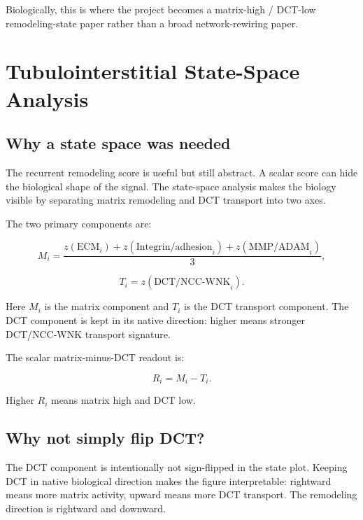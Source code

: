 \documentclass[11pt]{article}
\begin{document}
Biologically, this is where the project becomes a matrix-high / DCT-low remodeling-state paper rather than a broad network-rewiring paper.

\section{Tubulointerstitial State-Space Analysis}

\subsection{Why a state space was needed}

The recurrent remodeling score is useful but still abstract. A scalar score can hide the biological shape of the signal. The state-space analysis makes the biology visible by separating matrix remodeling and DCT transport into two axes.

The two primary components are:

\begin{equation}
M_i=\frac{z(\mathrm{ECM}_i)+z(\mathrm{Integrin/adhesion}_i)+z(\mathrm{MMP/ADAM}_i)}{3},
\end{equation}

\begin{equation}
T_i=z(\mathrm{DCT/NCC\mbox{-}WNK}_i).
\end{equation}

Here $M_i$ is the matrix component and $T_i$ is the DCT transport component. The DCT component is kept in its native direction: higher means stronger DCT/NCC-WNK transport signature.

The scalar matrix-minus-DCT readout is:

\begin{equation}
R_i=M_i-T_i.
\end{equation}

Higher $R_i$ means matrix high and DCT low.

\subsection{Why not simply flip DCT?}

The DCT component is intentionally not sign-flipped in the state plot. Keeping DCT in native biological direction makes the figure interpretable: rightward means more matrix activity, upward means more DCT transport. The remodeling direction is rightward and downward.
\end{document}
